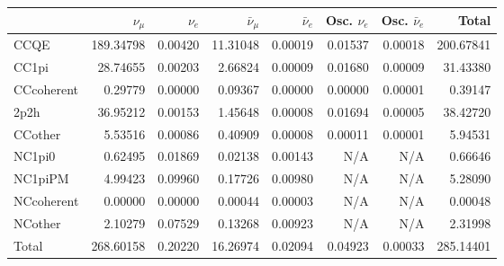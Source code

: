 \begin{tabular} { | l ||r | r | r | r | r | r | | r | }
\hline
              & $\nu_\mu$            & $\nu_e$              & $\bar{\nu}_{\mu}$    & $\bar{\nu}_{e}$      & Osc. $\nu_e$         & Osc. $\bar{\nu}_{e}$ & Total                \\ \hline\hline
 CCQE         & 189.34798            & 0.00420              & 11.31048             & 0.00019              & 0.01537              & 0.00018              & 200.67841            \\ \hline
 CC1pi        & 28.74655             & 0.00203              & 2.66824              & 0.00009              & 0.01680              & 0.00009              & 31.43380             \\ \hline
 CCcoherent   & 0.29779              & 0.00000              & 0.09367              & 0.00000              & 0.00000              & 0.00001              & 0.39147              \\ \hline
 2p2h         & 36.95212             & 0.00153              & 1.45648              & 0.00008              & 0.01694              & 0.00005              & 38.42720             \\ \hline
 CCother      & 5.53516              & 0.00086              & 0.40909              & 0.00008              & 0.00011              & 0.00001              & 5.94531              \\ \hline
 NC1pi0       & 0.62495              & 0.01869              & 0.02138              & 0.00143              & N/A                  & N/A                  & 0.66646              \\ \hline
 NC1piPM      & 4.99423              & 0.09960              & 0.17726              & 0.00980              & N/A                  & N/A                  & 5.28090              \\ \hline
 NCcoherent   & 0.00000              & 0.00000              & 0.00044              & 0.00003              & N/A                  & N/A                  & 0.00048              \\ \hline
 NCother      & 2.10279              & 0.07529              & 0.13268              & 0.00923              & N/A                  & N/A                  & 2.31998              \\ \hline
\hline
 Total        & 268.60158            & 0.20220              & 16.26974             & 0.02094              & 0.04923              & 0.00033              & 285.14401            \\ \hline

\end{tabular}
